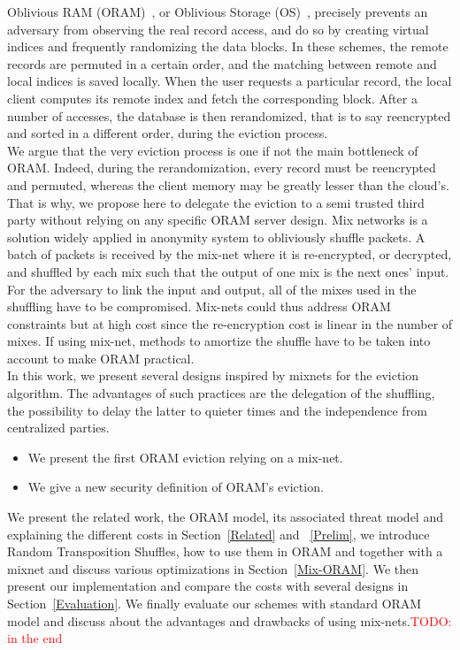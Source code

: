 \documentclass{llncs}
\newcommand{\todo}[1]{\textcolor{red}{TODO: #1}}
\begin{document}
Oblivious RAM (ORAM)~\cite{goldreich87}, or Oblivious Storage (OS)~\cite{boneh2011}, precisely prevents an adversary from observing the real record access, and do so by creating virtual indices and frequently randomizing the data blocks. In these schemes, the remote records are permuted in a certain order, and the matching between remote and local indices is saved locally. When the user requests a particular record, the local client  computes its remote index and fetch the corresponding block. After a number of accesses, the database is then rerandomized, that is to say reencrypted and sorted in a different order, during the eviction process.\\ 
We argue that the very eviction process is one if not the main bottleneck of ORAM. Indeed, during the rerandomization, every record must be reencrypted and permuted, whereas the client memory may be greatly lesser than the cloud's. That is why, we propose here to delegate the eviction to a semi trusted third party without relying on any specific ORAM server design.
Mix networks is a solution widely applied in anonymity system to obliviously shuffle packets. A batch of packets is received by the mix-net where it is re-encrypted, or decrypted, and shuffled by each mix such that the output of one mix is the next ones' input.
For the adversary to link the input and output, all of the mixes used in the shuffling have to be compromised.
Mix-nets could thus address ORAM constraints but at high cost since the re-encryption cost is linear in the number of mixes. If using mix-net, methods to amortize the shuffle have to be taken into account to make ORAM practical.\\

In this work, we present several designs inspired by mixnets for the eviction algorithm.
The advantages of such practices are the delegation of the shuffling, the possibility to delay the latter to quieter times and the independence from centralized parties.

\begin{itemize}
 \item We present the first ORAM eviction relying on a mix-net.
 \item We give a new security definition of ORAM's eviction. %
\end{itemize}


We present the related work, the ORAM model, its associated threat model and explaining the different costs in Section~\ref{Related} and ~\ref{Prelim}, we introduce Random Transposition Shuffles, how to use them in ORAM and together with a mixnet and discuss various optimizations in Section~\ref{Mix-ORAM}. We then present our implementation and compare the costs with several designs in Section~\ref{Evaluation}.
We finally evaluate our schemes with standard ORAM model and discuss about the advantages and drawbacks of using mix-nets.\todo{in the end}
%
\end{document}

